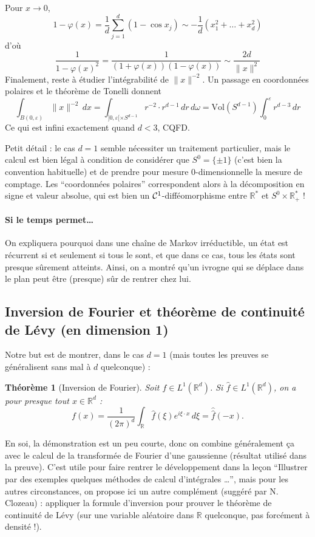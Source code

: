 \documentclass[a4paper, 11pt]{article}
\def\R{\mathbb{R}}
\def\Cf{{\cal{C}}}
\def\Vol{\mathrm{Vol}}
\newtheorem*{theorem}{Théorème}
\begin{document}
Pour $x \to 0$,
\[ 1 - \varphi(x) = \frac{1}{d} \sum_{j=1}^d (1 - \cos x_j) \sim
  -\frac{1}{d}(x_1^2 + \ldots + x_d^2) \] d'où
\[\frac{1}{1 - \varphi(x)^2} = \frac{1}{(1 + \varphi(x))(1 - \varphi(x))} \sim
  \frac{2d}{\|x\|^2} \]
Finalement, reste à étudier l'intégrabilité de $\|x\|^{-2}$. Un passage en
coordonnées polaires et le théorème de Tonelli donnent
\[ \int_{B(0,\varepsilon)} \|x\|^{-2}\,dx = \int_{]0,\varepsilon[ \times S^{d-1}}
  r^{-2} \cdot r^{d-1}\,dr\,d\omega = \Vol(S^{d-1}) \int_0^\varepsilon
  r^{d-3}\,dr \]
Ce qui est infini exactement quand $d < 3$, CQFD.

Petit détail : le cas $d=1$ semble nécessiter un traitement particulier,
mais le calcul est bien légal à condition de considérer que $S^0 = \{\pm 1\}$
(c'est bien la convention habituelle) et de prendre pour mesure 0-dimensionnelle
la mesure de comptage. Les \enquote{coordonnées polaires} correspondent alors à
la décomposition en signe et valeur absolue, qui est bien un
$\Cf^1$-difféomorphisme entre $\R^*$ et $S^0 \times \R_+^*$ !

\paragraph{Si le temps permet…} On expliquera pourquoi dans une chaîne de Markov
irréductible, un état est récurrent si et seulement si tous le sont, et que dans
ce cas, tous les états sont presque sûrement atteints. Ainsi, on a montré qu'un
ivrogne qui se déplace dans le plan peut être (presque) sûr de rentrer chez lui.

\newpage

\subsection{Inversion de Fourier et théorème de continuité de Lévy (en dimension 1)}

Notre but est de montrer, dans le cas $d = 1$ (mais toutes les preuves se
généralisent sans mal à $d$ quelconque) :

\begin{theorem}[Inversion de Fourier]
  Soit $f \in L^1(\R^d)$. Si $\hat{f} \in L^1(\R^d)$, on a pour presque
  tout $x \in \R^d$ :
\[ f(x) = \frac{1}{(2\pi)^d} \int_\R \hat{f}(\xi) e^{i\xi \cdot x} \,d\xi =
  \hat{\hat{f}}(-x). \]
\end{theorem}

En soi, la démonstration est un peu courte, donc on combine généralement ça avec
le calcul de la transformée de Fourier d'une gaussienne (résultat utilisé dans
la preuve). C'est utile pour faire rentrer le développement dans la leçon
\enquote{Illustrer par des exemples quelques méthodes de calcul d'intégrales …},
mais pour les autres circonstances, on propose ici un autre complément (suggéré
par N. Clozeau) : appliquer la formule d'inversion pour prouver le théorème de
continuité de Lévy (sur une variable aléatoire dans $\R$ quelconque, pas
forcément à densité !).
\end{document}

